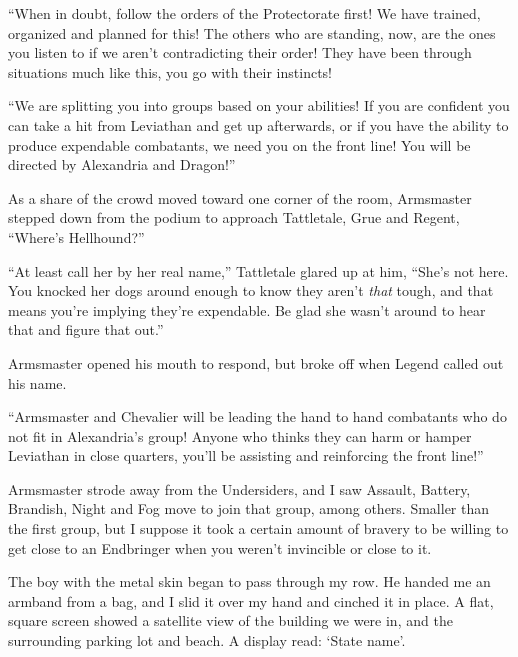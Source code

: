 ``When in doubt, follow the orders of the Protectorate first!  We have trained, organized and planned for this!  The others who are standing, now, are the ones you listen to if we aren't contradicting their order!  They have been through situations much like this, you go with their instincts!



``We are splitting you into groups based on your abilities!  If you are confident you can take a hit from Leviathan and get up afterwards, or if you have the ability to produce expendable combatants, we need you on the front line!  You will be directed by Alexandria and Dragon!''



As a share of the crowd moved toward one corner of the room, Armsmaster stepped down from the podium to approach Tattletale, Grue and Regent, ``Where's Hellhound?''



``At least call her by her real name,'' Tattletale glared up at him, ``She's not here.  You knocked her dogs around enough to know they aren't \emph{that} tough, and that means you're implying they're expendable.  Be glad she wasn't around to hear that and figure that out.''



Armsmaster opened his mouth to respond, but broke off when Legend called out his name.



``Armsmaster and Chevalier will be leading the hand to hand combatants who do not fit in Alexandria's group!  Anyone who thinks they can harm or hamper Leviathan in close quarters, you'll be assisting and reinforcing the front line!''



Armsmaster strode away from the Undersiders, and I saw Assault, Battery, Brandish, Night and Fog move to join that group, among others.  Smaller than the first group, but I suppose it took a certain amount of bravery to be willing to get close to an Endbringer when you weren't invincible or close to it.



The boy with the metal skin began to pass through my row.  He handed me an armband from a bag, and I slid it over my hand and cinched it in place.  A flat, square screen showed a satellite view of the building we were in, and the surrounding parking lot and beach.  A display read: `State name'.



